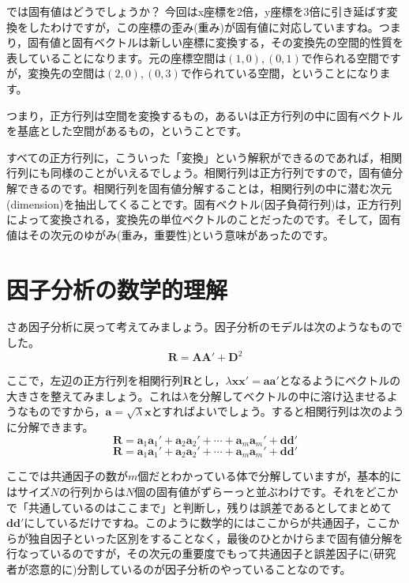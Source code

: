 \documentclass{ltjsbook}
\begin{document}
では固有値はどうでしょうか？ 今回はx座標を2倍，y座標を3倍に引き延ばす変換をしたわけですが，この座標の歪み(重み)が固有値に対応していますね。つまり，固有値と固有ベクトルは新しい座標に変換する，その変換先の空間的性質を表していることになります。元の座標空間は$(1,0),(0,1)$で作られる空間ですが，変換先の空間は$(2,0),(0,3)$で作られている空間，ということになります。

つまり，正方行列は空間を変換するもの，あるいは正方行列の中に固有ベクトルを基底とした空間があるもの，ということです。

すべての正方行列に，こういった「変換」という解釈ができるのであれば，相関行列にも同様のことがいえるでしょう。相関行列は正方行列ですので，固有値分解できるのです。相関行列を固有値分解することは，相関行列の中に潜む次元(dimension)を抽出してくることです。固有ベクトル(因子負荷行列)は，正方行列によって変換される，変換先の単位ベクトルのことだったのです。そして，固有値はその次元のゆがみ(重み，重要性)という意味があったのです。

\section{因子分析の数学的理解}
さあ因子分析に戻って考えてみましょう。因子分析のモデルは次のようなものでした。
\begin{equation}
	\bm{R} = \bm{A} \bm{A} ' + \bm{D}^2
\end{equation}

ここで，左辺の正方行列を相関行列$\bm{R}$とし，$\lambda \bm{xx'} = \bm{aa'}$となるようにベクトルの大きさを整えてみましょう。これは$\lambda$を分解してベクトルの中に溶け込ませるようなものですから，$\bm{a} = \sqrt{\lambda}\bm{x}$とすればよいでしょう。すると相関行列は次のように分解できます。
\begin{equation}
	\bm{R}=\bm{a}_1\bm{a}_1'+\bm{a}_2\bm{a}_2'+\cdots +\bm{a}_m\bm{a}_m'+\bm{d} \bm{d}'
\end{equation}
\begin{equation}
	\bm{R}=\bm{a}_1\bm{a}_1'+\bm{a}_2\bm{a}_2'+\cdots +\bm{a}_m\bm{a}_m'+\bm{d} \bm{d}'
\end{equation}

ここでは共通因子の数が$m$個だとわかっている体で分解していますが，基本的にはサイズ$N$の行列からは$N$個の固有値がずらーっと並ぶわけです。それをどこかで「共通しているのはここまで」と判断し，残りは誤差であるとしてまとめて$\bm{dd'}$にしているだけですね。このように数学的にはここからが共通因子，ここからが独自因子といった区別をすることなく，最後のひとかけらまで固有値分解を行なっているのですが，その次元の重要度でもって共通因子と誤差因子に(研究者が恣意的に)分割しているのが因子分析のやっていることなのです。
\end{document}
